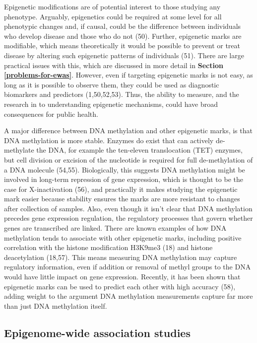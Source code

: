 \documentclass[11pt,oneside]{bristolthesis}
\begin{document}
Epigenetic modifications are of potential interest to those studying any phenotype. Arguably, epigenetics could be required at some level for all phenotypic changes and, if causal, could be the difference between individuals who develop disease and those who do not (50). Further, epigenetic marks are modifiable, which means theoretically it would be possible to prevent or treat disease by altering such epigenetic patterns of individuals (51). There are large practical issues with this, which are discussed in more detail in \textbf{Section \ref{problems-for-ewas}}. However, even if targeting epigenetic marks is not easy, as long as it is possible to observe them, they could be used as diagnostic biomarkers and predictors (1,50,52,53). Thus, the ability to measure, and the research in to understanding epigenetic mechanisms, could have broad consequences for public health.

A major difference between DNA methylation and other epigenetic marks, is that DNA methylation is more stable. Enzymes do exist that can actively de-methylate the DNA, for example the ten-eleven translocation (TET) enzymes, but cell division or excision of the nucleotide is required for full de-methylation of a DNA molecule (54,55). Biologically, this suggests DNA methylation might be involved in long-term repression of gene expression, which is thought to be the case for X-inactivation (56), and practically it makes studying the epigenetic mark easier because stability ensures the marks are more resistant to changes after collection of samples. Also, even though it isn't clear that DNA methylation precedes gene expression regulation, the regulatory processes that govern whether genes are transcribed are linked. There are known examples of how DNA methylation tends to associate with other epigenetic marks, including positive correlation with the histone modification H3K9me3 (18) and histone deacetylation (18,57). This means measuring DNA methylation may capture regulatory information, even if addition or removal of methyl groups to the DNA would have little impact on gene expression. Recently, it has been shown that epigenetic marks can be used to predict each other with high accuracy (58), adding weight to the argument DNA methylation measurements capture far more than just DNA methylation itself.

\hypertarget{ewas}{%
\subsection{Epigenome-wide association studies}\label{ewas}}
\end{document}
